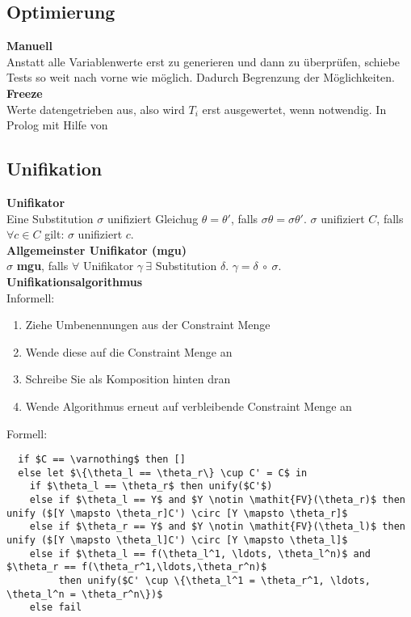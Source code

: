 \subsection{Optimierung}%
\label{lp:sub:optimierung}
\textbf{Manuell}\\
Anstatt alle Variablenwerte erst zu generieren und dann zu überprüfen, schiebe Tests so weit nach vorne wie möglich.
Dadurch Begrenzung der Möglichkeiten.\\

\textbf{Freeze}\\
Werte datengetrieben aus, also wird \(T_i\) erst ausgewertet, wenn notwendig.
In Prolog mit Hilfe von 

\subsection{Unifikation}%
\label{lp:sub:unifikation}
\textbf{Unifikator}\\
Eine Substitution \(\sigma\) unifiziert Gleichug \(\theta = \theta'\), falls \(\sigma\theta = \sigma\theta'\).
\(\sigma\) unifiziert \(C\), falls \(\forall c \in C\) gilt: \(\sigma\) unifiziert \(c\).\\

\textbf{Allgemeinster Unifikator (mgu)}\\
\(\sigma\) \textbf{mgu}, falls \(\forall\) Unifikator \(\gamma\ \exists\) Substitution \(\delta\). \( \gamma = \delta\ \circ\ \sigma\).\\
\newpage
\textbf{Unifikationsalgorithmus}\\
Informell:
\begin{enumerate}
  \item Ziehe Umbenennungen aus der Constraint Menge
  \item Wende diese auf die Constraint Menge an
  \item Schreibe Sie als Komposition hinten dran
  \item Wende Algorithmus erneut auf verbleibende Constraint Menge an
\end{enumerate}
Formell:
\begin{lstlisting}
  if $C == \varnothing$ then []
  else let $\{\theta_l == \theta_r\} \cup C' = C$ in
    if $\theta_l == \theta_r$ then unify($C'$)
    else if $\theta_l == Y$ and $Y \notin \mathit{FV}(\theta_r)$ then unify ($[Y \mapsto \theta_r]C') \circ [Y \mapsto \theta_r]$
    else if $\theta_r == Y$ and $Y \notin \mathit{FV}(\theta_l)$ then unify ($[Y \mapsto \theta_l]C') \circ [Y \mapsto \theta_l]$
    else if $\theta_l == f(\theta_l^1, \ldots, \theta_l^n)$ and $\theta_r == f(\theta_r^1,\ldots,\theta_r^n)$
         then unify($C' \cup \{\theta_l^1 = \theta_r^1, \ldots, \theta_l^n = \theta_r^n\})$
    else fail
\end{lstlisting}
  
